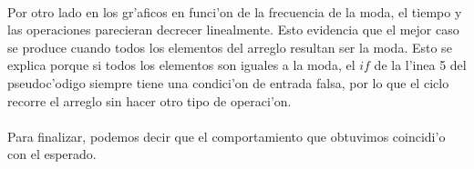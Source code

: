 \paragraph{}
Por otro lado en los gr'aficos en funci'on 
de la frecuencia de la moda, el tiempo y las operaciones parecieran decrecer linealmente. Esto 
evidencia que el mejor caso se produce cuando todos los elementos del arreglo resultan ser la moda. Esto se
explica porque si todos los elementos son iguales a la moda, el $if$ de la l'inea 5 del pseudoc'odigo
siempre tiene una condici'on de entrada falsa, por lo que el ciclo recorre el arreglo sin 
hacer otro tipo de operaci'on. 
\paragraph{}
Para finalizar, podemos decir que el comportamiento que obtuvimos coincidi'o con el esperado.
